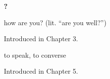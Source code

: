 \noindent\begin{minipage}[t]{\linewidth}
\raggedright
\textbf{?}\par
\small how are you? (lit. \textquotedblleft{}are you well?\textquotedblright{})\par
\footnotesize Introduced in Chapter 3.
\end{minipage}\par\medskip

\noindent\begin{minipage}[t]{\linewidth}
\raggedright
\textbf{}\par
\small to speak, to converse\par
\footnotesize Introduced in Chapter 5.
\end{minipage}\par\medskip
